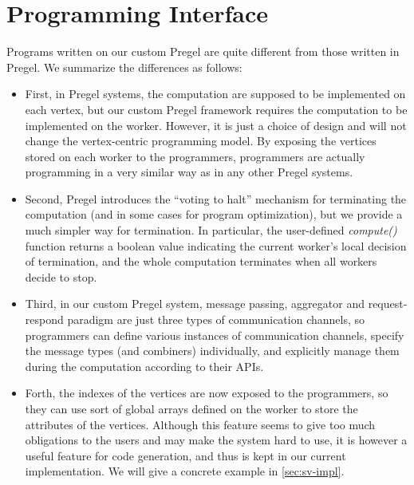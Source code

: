 \documentclass{sokendai_thesis} %
\newcommand{\plus}{\raisebox{.25ex}{\scalebox{.8}{+}}}
\begin{document}

\section{Programming Interface}

Programs written on our custom Pregel are quite different from those written in Pregel.
We summarize the differences as follows:
\begin{itemize}\setlength\itemsep{0em}
\item
 First, in Pregel systems, the computation are supposed to be implemented on each vertex, but our custom Pregel framework requires the computation to be implemented on the worker.
 However, it is just a choice of design and will not change the vertex-centric programming model.
 By exposing the vertices stored on each worker to the programmers, programmers are actually programming in a very similar way as in any other Pregel systems.
\item
 Second, Pregel introduces the ``voting to halt'' mechanism for terminating the computation (and in some cases for program optimization), but we provide a much simpler way for termination.
 In particular, the user-defined \emph{compute()} function returns a boolean value indicating the current worker's local decision of termination, and the whole computation terminates when all workers decide to stop.
\item
 Third, in our custom Pregel system, message passing, aggregator and request-respond paradigm are just three types of communication channels, so programmers can define various instances of communication channels, specify the message types (and combiners) individually, and explicitly manage them during the computation according to their APIs.
\item
 Forth, the indexes of the vertices are now exposed to the programmers, so they can use sort of global arrays defined on the worker to store the attributes of the vertices.
 Although this feature seems to give too much obligations to the users and may make the system hard to use, it is however a useful feature for code generation, and thus is kept in our current implementation.
 We will give a concrete example in \autoref{sec:sv-impl}.
\end{itemize}
\end{document}

